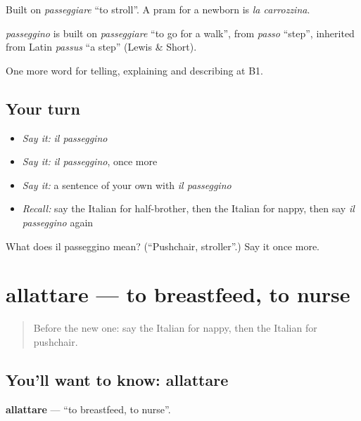 Built on \emph{passeggiare} \textquotedblleft{}to stroll\textquotedblright{}. A pram for a newborn is \emph{la carrozzina}.

\begin{cousinweb}
\emph{passeggino} is built on \emph{passeggiare} \textquotedblleft{}to go for a walk\textquotedblright{}, from \emph{passo} \textquotedblleft{}step\textquotedblright{}, inherited from Latin \emph{passus} \textquotedblleft{}a step\textquotedblright{} (Lewis \& Short).
\end{cousinweb}

\begin{grammarlens}[title={What you've built}]
One more word for telling, explaining and describing at B1.
\end{grammarlens}

\subsection*{Your turn}
\begin{itemize}
\raggedright
  \item \emph{Say it:} \emph{il passeggino}
  \item \emph{Say it:} \emph{il passeggino}, once more
  \item \emph{Say it:} a sentence of your own with \emph{il passeggino}
  \item \emph{Recall:} say the Italian for half-brother, then the Italian for nappy, then say \emph{il passeggino} again
\end{itemize}

\begin{tcolorbox}[breakable,colback=teal!4,colframe=teal!35!black,title={Before you move on}]
What does il passeggino mean? (\textquotedblleft{}Pushchair, stroller\textquotedblright{}.) Say it once more.
\end{tcolorbox}
\section[allattare]{allattare — to breastfeed, to nurse}

\label{lesson:IT-C496-allattare}



\begin{quote}
Before the new one: say the Italian for nappy, then the Italian for pushchair.
\end{quote}

\subsection*{You'll want to know: allattare}
\textbf{allattare} — \textquotedblleft{}to breastfeed, to nurse\textquotedblright{}.


